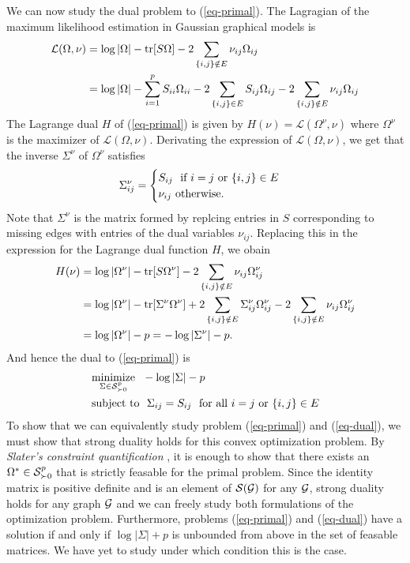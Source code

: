 We can now study the dual problem to (\ref{eq-primal}). The Lagragian of the maximum likelihood estimation in Gaussian graphical models is
\begin{align*}
    \mathcal{L}(\Omega, \nu)
    &= \log |\Omega| - \tr[S\Omega] - 2 \sum_{\eset{i, j} \notin E} \nu_{ij}\Omega_{ij}\\
    &= \log |\Omega| - \sum_{i=1}^p S_{ii}\Omega_{ii} - 2 \sum_{\eset{i,j} \in E} S_{ij}\Omega_{ij} - 2 \sum_{\eset{i, j} \notin E} \nu_{ij}\Omega_{ij}
\end{align*}
The Lagrange dual $H$ of (\ref{eq-primal}) is given by $H(\nu) = \mathcal{L}(\Omega^\nu, \nu)$ where $\Omega^\nu$ is the maximizer of $\mathcal{L}(\Omega, \nu)$. Derivating the expression of $\mathcal{L}(\Omega, \nu)$, we get that the inverse $\Sigma^\nu$ of $\Omega^\nu$ satisfies
\begin{equation*}
    \Sigma^\nu_{ij} = \begin{cases}
        S_{ij}\ \textrm{ if } i = j \textrm{ or } \eset{i, j} \in E\\
        \nu_{ij}\ \textrm{otherwise}.
    \end{cases}
\end{equation*}
Note that $\Sigma^\nu$ is the matrix formed by replcing entries in $S$ corresponding to missing edges with entries of the dual variables $\nu_{ij}$. Replacing this in the expression for the Lagrange dual function $H$, we obain
\begin{align*}
    H(\nu) 
    &= \log |\Omega^\nu| - \tr[S\Omega^\nu] - 2 \sum_{\eset{i, j} \notin E} \nu_{ij}\Omega^\nu_{ij}\\
    &= \log |\Omega^\nu| - \tr[\Sigma^\nu\Omega^\nu] + 2 \sum_{\eset{i, j} \notin E} \Sigma^\nu_{ij}\Omega^\nu_{ij} - 2 \sum_{\eset{i, j} \notin E} \nu_{ij}\Omega^\nu_{ij}\\
    &= \log |\Omega^\nu| - p = -\log |\Sigma^\nu| - p.
\end{align*}
And hence the dual to (\ref{eq-primal}) is
\begin{align} \label{eq-dual}
    \begin{split}
        &\underset{\Sigma \in \S^p_{\succ 0}}{\textrm{minimize}}\ \  -\log |\Sigma| - p\\
        &\textrm{subject to}\ \ \Sigma_{ij} = S_{ij}\ \textrm{ for all } i = j \textrm{ or } \eset{i, j} \in E
    \end{split}
\end{align}
To show that we can equivalently study problem (\ref{eq-primal}) and (\ref{eq-dual}), we must show that strong duality holds for this convex optimization problem. By \textit{Slater's constraint quantification} \cite[Section 5.3.2]{boyd2004convex}, it is enough to show that there exists an $\Omega^* \in \S^p_{\succ 0}$ that is strictly feasable for the primal problem. Since the identity matrix is positive definite and is an element of $\S(\G)$ for any $\G$, strong duality holds for any graph $\G$ and we can freely study both formulations of the optimization problem. Furthermore, problems (\ref{eq-primal}) and (\ref{eq-dual}) have a solution if and only if $\log |\Sigma| + p$ is unbounded from above in the set of feasable matrices. We have yet to study under which condition this is the case.

